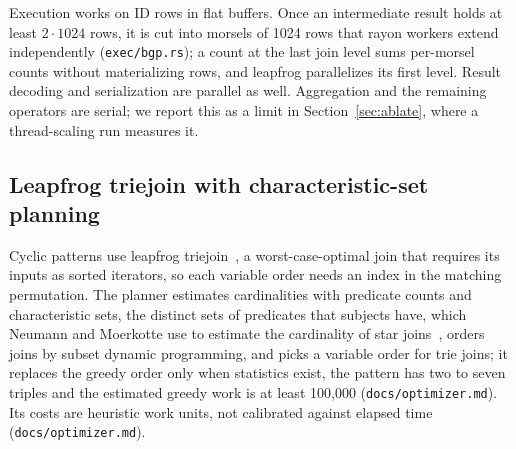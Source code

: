 \documentclass[sigconf, nonacm]{acmart}
\begin{document}
Execution works on ID rows in flat buffers. Once an intermediate result holds at least $2\cdot 1024$ rows, it is cut into morsels of 1024 rows that rayon workers extend independently (\texttt{exec/bgp.rs}); a count at the last join level sums per-morsel counts without materializing rows, and leapfrog parallelizes its first level. Result decoding and serialization are parallel as well. Aggregation and the remaining operators are serial; we report this as a limit in Section~\ref{sec:ablate}, where a thread-scaling run measures it.

\subsection{Leapfrog triejoin with characteristic-set planning}\label{sec:leapfrog}
Cyclic patterns use leapfrog triejoin~\cite{veldhuizen2014}, a worst-case-optimal join that requires its inputs as sorted iterators, so each variable order needs an index in the matching permutation. The planner estimates cardinalities with predicate counts and characteristic sets, the distinct sets of predicates that subjects have, which Neumann and Moerkotte use to estimate the cardinality of star joins~\cite{neumann2011}, orders joins by subset dynamic programming, and picks a variable order for trie joins;
it replaces the greedy order only when statistics exist, the pattern has two to seven triples and the estimated greedy work is at least 100,000 (\texttt{docs/optimizer.md}).
Its costs are heuristic work units, not calibrated against elapsed time (\texttt{docs/optimizer.md}).
\end{document}
